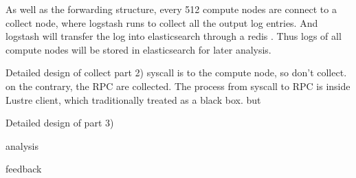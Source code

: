 \documentclass{article}
\begin{document}
As well as the forwarding structure, every 512 compute nodes are connect to a collect node, where logstash runs to collect all the output log entries. And logstash will transfer the log into elasticsearch through a redis . Thus logs of all compute nodes will be stored in elasticsearch for later analysis.

Detailed design of collect part 2)
syscall is  to the compute node, so don't collect.
on the contrary, the RPC are collected.
The process from syscall to RPC is inside Lustre client, which traditionally treated as a black box.
but 

Detailed design of part 3)

analysis

feedback

\ifx\allfiles\undefined
\end{document}
